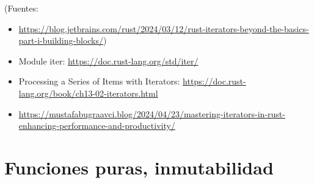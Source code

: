 (Fuentes: 
\begin{itemize}
   \item \url{https://blog.jetbrains.com/rust/2024/03/12/rust-iterators-beyond-the-basics-part-i-building-blocks/})
   \item Module iter: \url{https://doc.rust-lang.org/std/iter/}
   \item Processing a Series of Items with Iterators: \url{https://doc.rust-lang.org/book/ch13-02-iterators.html}
   \item \url{https://mustafabugraavci.blog/2024/04/23/mastering-iterators-in-rust-enhancing-performance-and-productivity/}
   
\end{itemize}



\chapter{Funciones puras, inmutabilidad}
\label{ch_funciones_puras}

\IndiceCapitulo

